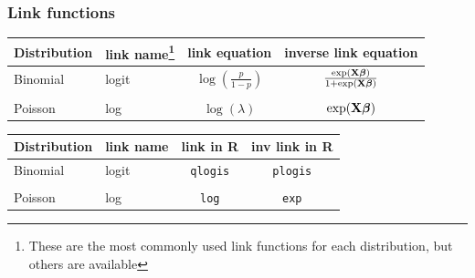 \documentclass[color=usenames,dvipsnames]{beamer}\usepackage[]{graphicx}\usepackage[]{color}
\begin{document}
\begin{frame}
  \frametitle{Link functions}
  \begin{tabular}{llcc}
    \hline
    Distribution & link name\footnote{These are the most commonly used link functions for each distribution, but others are available} & link equation             & inverse link equation       \\
    \hline
    Binomial     & logit     & $\log(\frac{p}{1-p})$ & $\frac{\exp({\bf
          X}{\bm \beta})}{1 + \exp({\bf X}{\bm \beta})}$                        \\
                 &           &                           &                             \\
    Poisson      & log       & $\log(\lambda)$               & $\exp({\bf X}{\bm \beta})$  \\
    \hline
  \end{tabular}

\pause
\vfill

\begin{tabular}{llcc}
    \hline
    Distribution & link name & link in {\bf R}  & inv link in {\bf R}       \\
    \hline
    Binomial     & logit     & {\tt qlogis} & {\tt plogis}                        \\
                 &           &                           &                             \\
    Poisson      & log       & {\tt log}    & {\tt exp}  \\
    \hline
  \end{tabular}
\end{frame}






\end{document}
